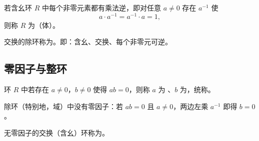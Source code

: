 \begin{definition}
若含幺环 $R$ 中每个非零元素都有乘法逆，即对任意 $a\ne 0$ 存在 $a^{-1}$
使
\[
  a\cdot a^{-1} = a^{-1}\cdot a = 1,
\]
则称 $R$ 为（体）。
\end{definition}

\begin{definition}[域（Field）]
交换的除环称为。即：含幺、交换、每个非零元可逆。
\end{definition}

\subsection{零因子与整环}

\begin{definition}
环 $R$ 中若存在 $a\ne 0$，$b\ne 0$ 使得 $ab = 0$，则称 $a$ 为
、$b$ 为，统称。
\end{definition}

除环（特别地，域）中没有零因子：若 $ab = 0$ 且 $a\ne 0$，两边左乘
$a^{-1}$ 即得 $b = 0$。

\begin{definition}
无零因子的交换（含幺）环称为。
\end{definition}
